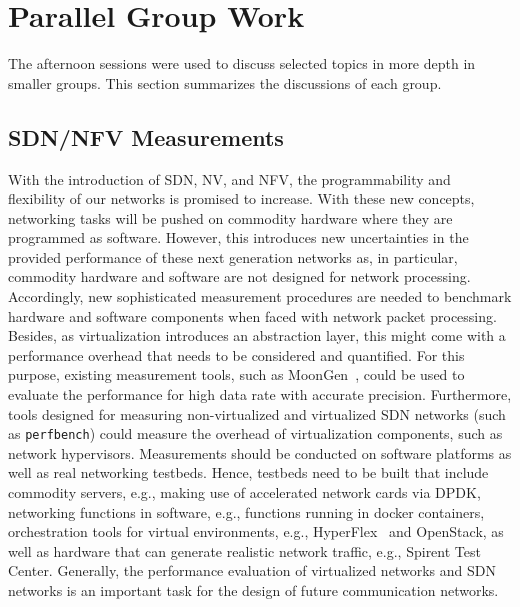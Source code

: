 \section{Parallel Group Work}\label{sec:parallel-group-work}

The afternoon sessions were used to discuss selected topics in more depth in
smaller groups. This section summarizes the discussions of each group.

\subsection{SDN/NFV Measurements}

With the introduction of \ac{SDN}, \ac{NV}, and \ac{NFV}, the programmability
and flexibility of our networks is promised to increase. With these new
concepts, networking tasks will be pushed on commodity hardware where they are
programmed as software.  However, this introduces new uncertainties in the
provided performance of these next generation networks as, in particular,
commodity hardware and software are not designed for network processing.
Accordingly, new sophisticated measurement procedures are needed to benchmark
hardware and software components when faced with network packet processing.
Besides, as virtualization introduces an abstraction layer, this might come
with a performance overhead that needs to be considered and quantified. For
this purpose, existing measurement tools, such as MoonGen~\cite{pemmerich:imc:2015}, could be used to evaluate the performance for high
data rate with accurate precision.  Furthermore, tools designed for measuring
non-virtualized and virtualized \ac{SDN} networks (such as \texttt{perfbench}) could
measure the overhead of virtualization components, such as network
hypervisors. Measurements should be conducted on software platforms as well as
real networking testbeds. Hence, testbeds need to be built that include
commodity servers, e.g., making use of accelerated network cards via
\ac{DPDK}, networking functions in software, e.g., functions running in docker
containers, orchestration tools for virtual environments, e.g., HyperFlex~\cite{ablenk:im:2015} and OpenStack, as well as hardware that can generate
realistic network traffic, e.g., Spirent Test Center.  Generally, the
performance evaluation of virtualized networks and SDN networks is an
important task for the design of future communication networks.

